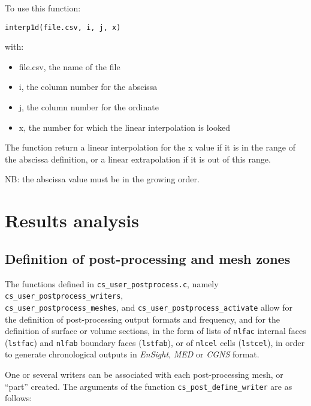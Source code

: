 {{{To use this function:

\texttt{interp1d(file.csv, i, j, x)}

with:
\begin{itemize}
\item file.csv, the name of the file
\item i, the column number for the abscissa
\item j, the column number for the ordinate
\item x, the number for which the linear interpolation is looked
\end{itemize}
The function return a linear interpolation for the x value
if it is in the range of the abscissa definition, or a
linear extrapolation if it is out of this range.

NB: the abscissa value must be in the growing order.

\section{Results analysis}

\subsection{Definition of post-processing and mesh zones}
\label{sec:prg_definitionpostprocess}
The functions defined in \texttt{cs\_user\_postprocess.c}, namely
\texttt{cs\_user\_postprocess\_writers}, \\ \texttt{cs\_user\_postprocess\_meshes},
and \texttt{cs\_user\_postprocess\_activate} allow for
the definition of post-processing output formats and frequency, and
for the definition of  surface or volume sections, in the form
of lists of \texttt{nlfac} internal faces (\texttt{lstfac}) and
\texttt{nlfab} boundary faces (\texttt{lstfab}),
or of \texttt{nlcel} cells (\texttt{lstcel}), in order to generate
chronological outputs in {\em EnSight}, {\em MED} or {\em CGNS} format.

One or several writers can be associated with each post-processing
mesh, or ``part'' created. The arguments of the function
\texttt{cs\_post\_define\_writer} are as follows:

}}}
